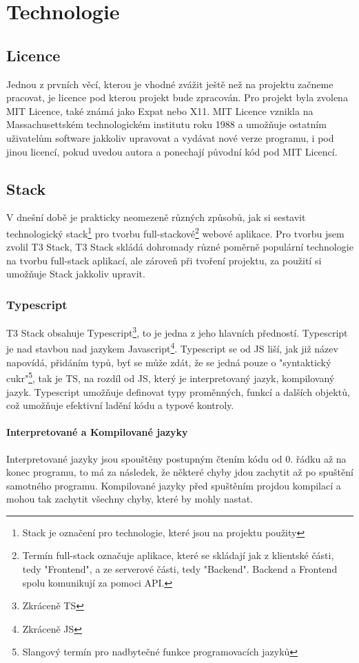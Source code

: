 \chapter{Technologie}
\section{Licence}
Jednou z prvních věcí, kterou je vhodné zvážit ještě než na projektu začneme pracovat, je licence pod kterou projekt bude zpracován. Pro projekt byla zvolena MIT Licence, také známá jako Expat nebo X11\cite{GNU-Mit}. MIT Licence vznikla na Massachusettském technologickém institutu roku 1988 a umožňuje ostatním uživatelům software jakkoliv upravovat a vydávat nové verze programu, i pod jinou licencí, pokud uvedou autora a ponechají původní kód pod MIT Licencí\cite{Github-Mit}.
\section{Stack}
V dnešní době je prakticky neomezeně různých způsobů, jak si sestavit technologický stack\footnote{Stack je označení pro technologie, které jsou na projektu použity} pro tvorbu full-stackové\footnote{Termín full-stack označuje aplikace, které se skládají jak z klientské části, tedy "Frontend", a ze serverové části, tedy "Backend". Backend a Frontend spolu komunikují za pomoci API.} webové aplikace.
Pro tvorbu jsem zvolil T3 Stack, T3 Stack skládá dohromady různé poměrně populární technologie na tvorbu full-stack aplikací, ale zároveň při tvoření projektu, za použití  si umožňuje Stack jakkoliv upravit\cite{t3stack}.
\subsection{Typescript}
T3 Stack obsahuje Typescript\footnote{Zkráceně TS}, to je jedna z jeho hlavních předností. Typescript je nad stavbou nad jazykem Javascript\footnote{Zkráceně JS}. Typescript se od JS liší, jak již název napovídá, přidáním typů, byť se může zdát, že se jedná pouze o "syntaktický cukr"\footnote{Slangový termín pro nadbytečné funkce programovacích jazyků}, tak je TS, na rozdíl od JS, který je interpretovaný jazyk, kompilovaný jazyk. Typescript umožňuje definovat typy proměnných, funkcí a dalších objektů, což umožňuje efektivní ladění kódu a typové kontroly.

\subsubsection{Interpretované a Kompilované jazyky}
Interpretované jazyky jsou spouštěny postupným čtením kódu od 0. řádku až na konec programu, to má za následek, že některé chyby jdou zachytit až po spuštění samotného programu. Kompilované jazyky před spuštěním projdou kompilací a mohou tak zachytit všechny chyby, které by mohly nastat.

